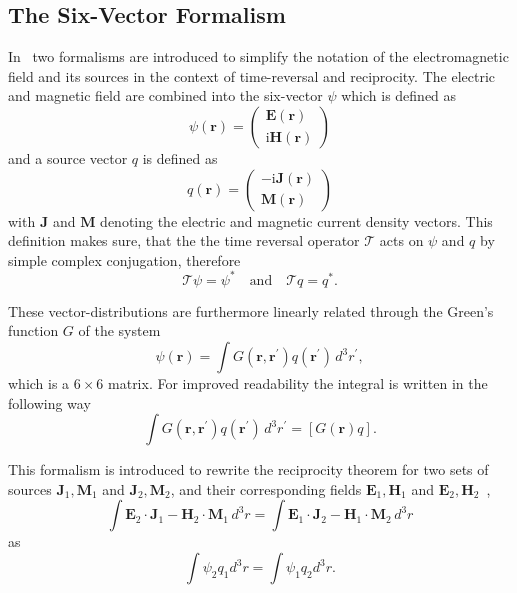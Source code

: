 \subsection{The Six-Vector Formalism}
In~\parencite{de_rosny_theory_2010} two formalisms are introduced to simplify the notation of the electromagnetic field and its sources in the context of time-reversal and reciprocity.
The electric and magnetic field are combined into the  six-vector \(\psi \) which is defined as
\begin{equation}
    \psi(\bm{r}) = \begin{pmatrix}
        \bm{E}(\bm{r}) \\
        \mathrm{i} \bm{H}(\bm{r})
    \end{pmatrix}
\end{equation}
and a source vector \(q\) is defined as
\begin{equation}
    q(\bm{r}) = \begin{pmatrix}
        -\mathrm{i} \bm{J}(\bm{r}) \\
        \bm{M}(\bm{r})
    \end{pmatrix}
\end{equation}
with \(\bm{J}\) and \(\bm{M}\) denoting the electric and magnetic current density vectors.
This definition makes sure, that the the time reversal operator \(\mathcal{T}\) acts on \(\psi \) and \(q \) by simple complex conjugation, therefore
\begin{equation}
    \mathcal{T}\psi = \psi^* \quad \text{and} \quad \mathcal{T}q = q^*.
\end{equation}

These vector-distributions are furthermore linearly related through the Green's function \(G\) of the system
\begin{equation}
    \psi(\bm{r}) = \int G(\bm{r}, \bm{r}^{\prime}) q(\bm{r}^{\prime}) \, d^3 r^{\prime},
\end{equation}
which is a \(6 \times 6\) matrix.
For improved readability the integral is written in the following way
\begin{equation}
    \int G(\bm{r}, \bm{r}^{\prime}) q(\bm{r}^{\prime}) \, d^3 r^{\prime} = [G(\bm{r}) q].
\end{equation}

This formalism is introduced to rewrite the reciprocity theorem for two sets of sources \(\bm{J}_1, \bm{M}_1\) and \(\bm{J}_2, \bm{M}_2\), and their corresponding fields \(\bm{E}_1, \bm{H}_1\) and \(\bm{E}_2, \bm{H}_2\)~\parencite[p.~146]{balanis_antenna_2005},
\begin{equation}
    \int \bm{E}_2 \cdot \bm{J}_1 - \bm{H}_2 \cdot \bm{M}_1 \, d^3 r = \int \bm{E}_1 \cdot \bm{J}_2 - \bm{H}_1 \cdot \bm{M}_2 \, d^3 r
\end{equation}
as
\begin{equation}\label{eq:reciprocity_theorem}
    \int \psi_2 q_1 d^3 r = \int \psi_1 q_2 d^3 r.
\end{equation}

